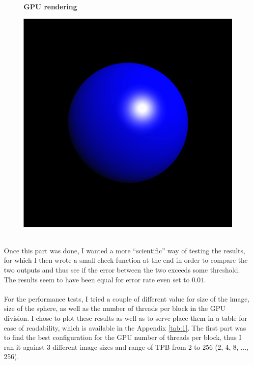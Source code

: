 \documentclass[english]{exam}
\begin{document}
\begin{figure}[H]
    \centering
    \textbf{GPU rendering}\par\medskip
    \includegraphics[scale=0.4]{gpu.png}
    \caption{}
\end{figure}


\ \\
\noindent
Once this part was done, I wanted a more ``scientific'' way of testing the results, for which I then wrote a small check function at the end in order to compare the two outputs and thus see if the error between the two exceeds some threshold. The results seem to have been equal for error rate even set to $0.01$.
\\\\
For the performance tests, I tried a couple of different value for size of the image, size of the sphere, as well as the number of threads per block in the GPU division. I chose to plot these results as well as to serve place them in a table for ease of readability, which is available in the Appendix \ref{tab:1}. The first part was to find the best configuration for the GPU number of threads per block, thus I ran it against 3 different image sizes and range of TPB from 2 to 256 (2, 4, 8, ..., 256).
\end{document}
